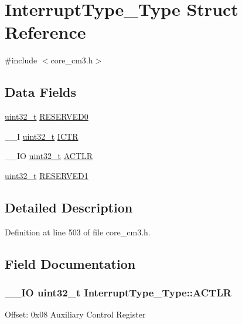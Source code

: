 \hypertarget{struct_interrupt_type___type}{\section{Interrupt\-Type\-\_\-\-Type Struct Reference}
\label{struct_interrupt_type___type}
}


{\ttfamily \#include $<$core\-\_\-cm3.\-h$>$}

\subsection*{Data Fields}
\begin{DoxyCompactItemize}
\item 
\hyperlink{stdint_8h_a435d1572bf3f880d55459d9805097f62}{uint32\-\_\-t} \hyperlink{struct_interrupt_type___type_ae0d588643b0488fce4c0a90b85edf362}{R\-E\-S\-E\-R\-V\-E\-D0}
\item 
\-\_\-\-\_\-\-I \hyperlink{stdint_8h_a435d1572bf3f880d55459d9805097f62}{uint32\-\_\-t} \hyperlink{struct_interrupt_type___type_a2b10f6d37363a6b798ac97f4c4db1e63}{I\-C\-T\-R}
\item 
\-\_\-\-\_\-\-I\-O \hyperlink{stdint_8h_a435d1572bf3f880d55459d9805097f62}{uint32\-\_\-t} \hyperlink{struct_interrupt_type___type_abcaf840b8160b3902b866bd47c77a997}{A\-C\-T\-L\-R}
\item 
\hyperlink{stdint_8h_a435d1572bf3f880d55459d9805097f62}{uint32\-\_\-t} \hyperlink{struct_interrupt_type___type_a45933eb981309d50f943ec3af67f17be}{R\-E\-S\-E\-R\-V\-E\-D1}
\end{DoxyCompactItemize}


\subsection{Detailed Description}


Definition at line 503 of file core\-\_\-cm3.\-h.



\subsection{Field Documentation}
\hypertarget{struct_interrupt_type___type_abcaf840b8160b3902b866bd47c77a997}{
\subsubsection[{A\-C\-T\-L\-R}]{\setlength{\rightskip}{0pt plus 5cm}\-\_\-\-\_\-\-I\-O {\bf uint32\-\_\-t} Interrupt\-Type\-\_\-\-Type\-::\-A\-C\-T\-L\-R}}\label{struct_interrupt_type___type_abcaf840b8160b3902b866bd47c77a997}
Offset\-: 0x08 Auxiliary Control Register 

